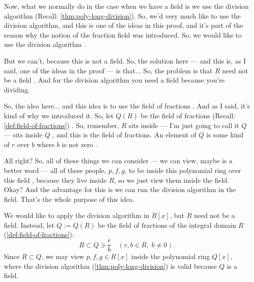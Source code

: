 \begin{proofWrapper}
\begin{speech}[00:18:50 - 00:20:57]
Now, what we normally do in the case when we have a field is we use the division algorithm (Recall: \cref{thm:poly-long-division}). So, we'd very much like to use the division algorithm, and this is one of the ideas in this proof, and it's part of the reason why the notion of the fraction field was introduced. So, we would like to use the division algorithm .

But we can't, because this is not a field. So, the solution here --- and this is, as I said, one of the ideas in the proof --- is that... So, the problem is that $R$ need not be a field . And for the division algorithm you need a field because you're dividing.

So, the idea here... and this idea is to use the field of fractions . And as I said, it's kind of why we introduced it. So, let $Q(R)$ be the field of fractions (Recall: \cref{def:field-of-fractions}) . So, remember, $R$ sits inside --- I'm just going to call it $Q$ --- sits inside $Q$ , and this is the field of fractions. An element of $Q$ is some kind of $r$ over $b$ where $b$ is not zero .

All right? So, all of these things we can consider --- we can view, maybe is a better word  --- all of these people, $p, f, g$, to be inside this polynomial ring over this field , because they live inside $R$, so we just view them inside the field. Okay? And the advantage for this is we can run the division algorithm in the field. That's the whole purpose of this idea. 
\end{speech}

\begin{content}
We would like to apply the division algorithm in $R[x]$, but $R$ need not be a field. Instead, let $Q := Q(R)$ be the field of fractions of the integral domain $R$ (\cref{def:field-of-fractions}):
\[
R \subset Q \ni \frac{r}{b} \quad (r, b \in R, \; b \neq 0).
\]
Since $R \subset Q$, we may view $p, f, g \in R[x]$ inside the polynomial ring $Q[x]$, where the division algorithm (\cref{thm:poly-long-division}) is valid because $Q$ is a field.
\end{content}


\end{proofWrapper}
